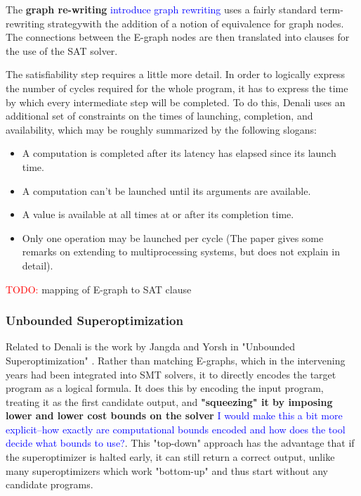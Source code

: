 \documentclass[12pt,twoside]{reedthesis}
\newcommand{\red}[1]{\textcolor{red}{#1}}
\newcommand{\comment}[2]{\textbf{#1} \textcolor{blue}{#2}}
\begin{document}
            The \comment{graph re-writing}{introduce graph rewriting} uses a fairly standard term-rewriting strategy\footnotemark with the addition of a notion of equivalence for graph nodes.
            The connections between the E-graph nodes are then translated into clauses for the use of the SAT solver.
                
                
            The satisfiability step requires a little more detail.
            In order to logically express the number of cycles required for the whole program, it has to express the time by which every intermediate step will be completed.
            To do this, Denali uses an additional set of constraints on the times of launching, completion, and availability, which may be roughly summarized by the following slogans:
            \begin{itemize}
                \item A computation is completed after its latency has elapsed since its launch time.
                \item A computation can't be launched until its arguments are available.
                \item A value is available at all times at or after its completion time.
                \item Only one operation may be launched per cycle (The paper gives some remarks on extending to multiprocessing systems, but does not explain in detail).
            \end{itemize}
                
            \red{TODO:} mapping of E-graph to SAT clause

        \subsubsection{Unbounded Superoptimization}
            Related to Denali is the work by Jangda and Yorsh in "Unbounded Superoptimization" \cite{jangda2017unbounded}.
            Rather than matching E-graphs, which in the intervening years had been integrated into SMT solvers, it to directly encodes the target program as a logical formula.
            It does this by encoding the input program, treating it as the first candidate output, and
                \comment{"squeezing" it by imposing lower and lower cost bounds on the solver}{I would make this a bit more explicit--how exactly are computational bounds encoded and how does the tool decide what bounds to use?}.
            This "top-down" approach has the advantage that if the superoptimizer is halted early, it can still return a correct output, unlike many superoptimizers which work "bottom-up" and thus start without any candidate programs.
                
\end{document}
